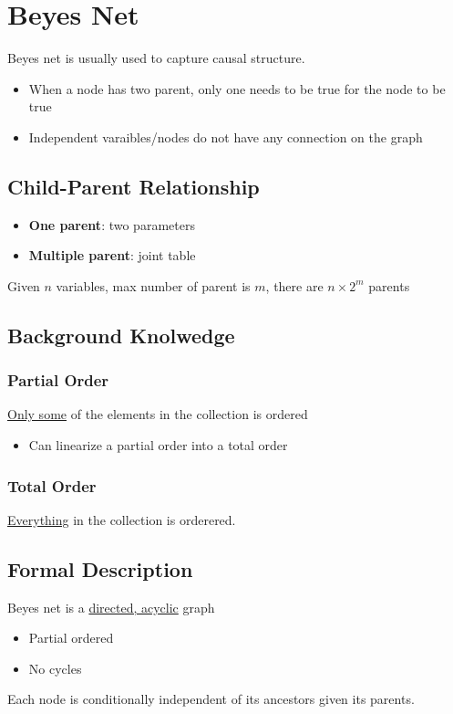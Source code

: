 \section{Beyes Net}

  Beyes net is usually used to capture causal structure.

  \begin{itemize}
    \item When a node has two parent, only one needs to be true for the
    node to be true
    \item Independent varaibles/nodes do not have any connection
    on the graph
  \end{itemize}

  \subsection{Child-Parent Relationship}

    \begin{itemize}
      \item \textbf{One parent}: two parameters
      \item \textbf{Multiple parent}: joint table
    \end{itemize}

    Given $ n $ variables, max number of parent is $ m $, there are
    $ n \times 2^{m} $ parents

  \subsection{Background Knolwedge}

    \subsubsection{Partial Order}

      \ul{Only some} of the elements in the collection is ordered

      \begin{itemize}
        \item Can linearize a partial order into a total order
      \end{itemize}

    \subsubsection{Total Order}

      \ul{Everything} in the collection is orderered.

  \subsection{Formal Description}

    Beyes net is a \ul{directed, acyclic} graph
    \begin{itemize}
      \item Partial ordered
      \item No cycles
    \end{itemize}

    Each node is conditionally independent of its ancestors
    given its parents.
